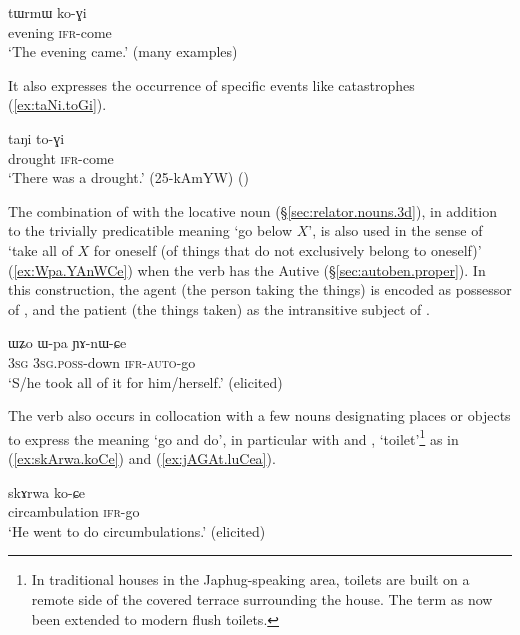 \begin{exe}
\ex \label{ex:tWrmW.koGi}
\gll tɯrmɯ ko-ɣi  \\
evening \textsc{ifr}-come \\
\glt `The evening came.' (many examples)
\end{exe}

It also expresses the occurrence of  specific events like catastrophes (\ref{ex:taNi.toGi}).

\begin{exe}
\ex \label{ex:taNi.toGi}
\gll taŋi to-ɣi \\
drought \textsc{ifr}-come \\
\glt `There was a drought.' (25-kAmYW)
()
\end{exe}

The combination of  with the locative noun  (§\ref{sec:relator.nouns.3d}), in addition to the trivially predicatible meaning `go below $X$', is also used in the sense of `take all of $X$ for oneself (of things that do not exclusively belong to oneself)' (\ref{ex:Wpa.YAnWCe}) when the verb has the Autive  (§\ref{sec:autoben.proper}). In this construction, the agent (the person taking the things) is encoded as possessor of , and the patient (the things taken) as the intransitive subject of .


\begin{exe}
\ex \label{ex:Wpa.YAnWCe}
\gll ɯʑo ɯ-pa ɲɤ-nɯ-ɕe \\
\textsc{3sg} \textsc{3sg}.\textsc{poss}-down \textsc{ifr}-\textsc{auto}-go \\
\glt `S/he took all of it for him/herself.' (elicited)
\end{exe}

The verb  also occurs in collocation with a few nouns designating places or objects to express the meaning `go and do', in particular with  and , `toilet'\footnote{In traditional houses in the Japhug-speaking area, toilets are built on a remote side of the covered terrace surrounding the house. The term as now been extended to modern flush toilets.} as in (\ref{ex:skArwa.koCe}) and (\ref{ex:jAGAt.luCea}).

 \begin{exe}
	\ex \label{ex:skArwa.koCe}
	\gll skɤrwa ko-ɕe \\
	circambulation \textsc{ifr}-go \\
	\glt `He went to do circumbulations.' (elicited)
\end{exe}

